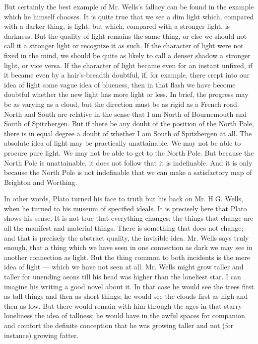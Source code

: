 But certainly the best example of Mr. Wells’s fallacy can be found in the example which he himself chooses. It is quite true that we see a dim light which, compared with a darker thing, is light, but which, compared with a stronger light, is darkness. But the quality of light remains the same thing, or else we should not call it a stronger light or recognize it as such. If the character of light were not fixed in the mind, we should be quite as likely to call a denser shadow a stronger light, or vice versa. If the character of light became even for an instant unfixed, if it became even by a hair’s-breadth doubtful, if, for example, there crept into our idea of light some vague idea of blueness, then in that flash we have become doubtful whether the new light has more light or less. In brief, the progress may be as varying as a cloud, but the direction must be as rigid as a French road. North and South are relative in the sense that I am North of Bournemouth and South of Spitzbergen. But if there be any doubt of the position of the North Pole, there is in equal degree a doubt of whether I am South of Spitzbergen at all. The absolute idea of light may be practically unattainable. We may not be able to procure pure light. We may not be able to get to the North Pole. But because the North Pole is unattainable, it does not follow that it is indefinable. And it is only because the North Pole is not indefinable that we can make a satisfactory map of Brighton and Worthing.

In other words, Plato turned his face to truth but his back on Mr. H.G. Wells, when he turned to his museum of specified ideals. It is precisely here that Plato shows his sense. It is not true that everything changes; the things that change are all the manifest and material things. There is something that does not change; and that is precisely the abstract quality, the invisible idea. Mr. Wells says truly enough, that a thing which we have seen in one connection as dark we may see in another connection as light. But the thing common to both incidents is the mere idea of light — which we have not seen at all. Mr. Wells might grow taller and taller for unending aeons till his head was higher than the loneliest star. I can imagine his writing a good novel about it. In that case he would see the trees first as tall things and then as short things; he would see the clouds first as high and then as low. But there would remain with him through the ages in that starry loneliness the idea of tallness; he would have in the awful spaces for companion and comfort the definite conception that he was growing taller and not (for instance) growing fatter.

